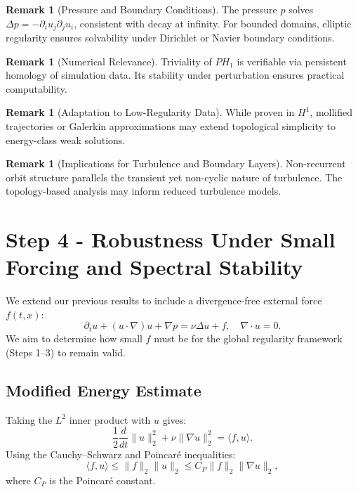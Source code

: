 \documentclass[11pt]{article}
\theoremstyle{definition}
\newtheorem{remark}[theorem]{Remark}
\begin{document}
\begin{remark}[Pressure and Boundary Conditions]
The pressure \( p \) solves \( \Delta p = -\partial_i u_j \partial_j u_i \), consistent with decay at infinity. For bounded domains, elliptic regularity ensures solvability under Dirichlet or Navier boundary conditions.
\end{remark}

\begin{remark}[Numerical Relevance]
Triviality of \( PH_1 \) is verifiable via persistent homology of simulation data. Its stability under perturbation ensures practical computability.
\end{remark}

\begin{remark}[Adaptation to Low-Regularity Data]
While proven in \( H^1 \), mollified trajectories or Galerkin approximations may extend topological simplicity to energy-class weak solutions.
\end{remark}

\begin{remark}[Implications for Turbulence and Boundary Layers]
Non-recurrent orbit structure parallels the transient yet non-cyclic nature of turbulence. The topology-based analysis may inform reduced turbulence models.
\end{remark}

\section{Step 4 - Robustness Under Small Forcing and Spectral Stability}
\label{sec:step4}

We extend our previous results to include a divergence-free external force $f(t,x)$:
\[
\partial_t u + (u \cdot \nabla)u + \nabla p = \nu \Delta u + f,\quad \nabla \cdot u = 0.
\]
We aim to determine how small $f$ must be for the global regularity framework (Steps 1–3) to remain valid.

\subsection*{Modified Energy Estimate}
Taking the $L^2$ inner product with $u$ gives:
\[
\frac{1}{2} \frac{d}{dt} \|u\|_2^2 + \nu \|\nabla u\|_2^2 = \langle f, u \rangle.
\]
Using the Cauchy–Schwarz and Poincaré inequalities:
\[
\langle f, u \rangle \le \|f\|_2 \|u\|_2 \le C_P \|f\|_2 \|\nabla u\|_2,
\]
where $C_P$ is the Poincaré constant.
\end{document}
